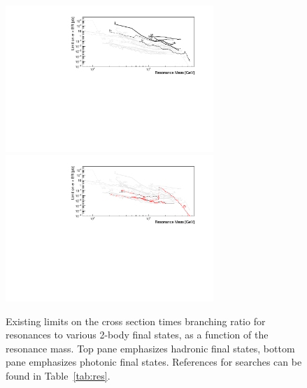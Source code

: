 \begin{figure}
\includegraphics[width=0.7\textwidth]{figures/chapter_topo/all_1.pdf}
\includegraphics[width=0.7\textwidth]{figures/chapter_topo/all_2.pdf}
\caption{ Existing limits on the cross section times branching ratio for resonances to various 2-body final states, as a function of the resonance mass. Top pane emphasizes hadronic final states, bottom pane emphasizes photonic final states. References for searches can be found in Table~\ref{tab:res}.}
\label{fig:jg}
\end{figure}

